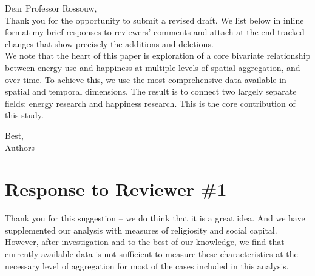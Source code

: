 \noindent Dear Professor Rossouw,\\

\noindent Thank you for the opportunity to submit a revised draft.
We list below in inline format my brief responses to reviewers'
 comments and attach at the end tracked changes that
 show precisely the additions and deletions.\\
 
 We note that the  heart of this paper is exploration of a core bivariate relationship between
 energy use and happiness at multiple levels of spatial aggregation, and over time. To achieve this, we use the most comprehensive data available in
 spatial and temporal dimensions. The result is to  connect two largely separate fields: energy
 research and happiness research. This is the core contribution of this study.
 

\noindent Best,\\
Authors
\vspace{.5in}






 
\newpage
\section{Response to Reviewer \#1} 



Thank you for this suggestion -- we do think that it is a great idea. And we have supplemented our analysis with measures of religiosity and social capital. 
However, after investigation and to the best of our knowledge, we find that currently available data is not sufficient to measure these characteristics at the necessary level of aggregation for most of the cases included in this analysis.  
\\

